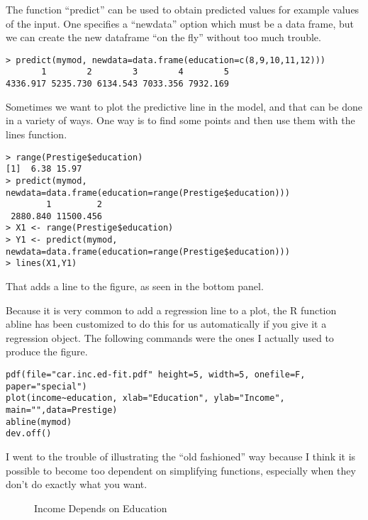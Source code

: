 The function ``predict'' can be used to obtain predicted values
for example values of the input. One specifies a ``newdata'' option
which must be a data frame, but we can create the new dataframe ``on
the fly'' without too much trouble. 

\begin{lstlisting}
> predict(mymod, newdata=data.frame(education=c(8,9,10,11,12)))
       1        2        3        4        5 
4336.917 5235.730 6134.543 7033.356 7932.169 
\end{lstlisting}
Sometimes we want to plot the predictive line in the model, and that
can be done in a variety of ways. One way is to find some points and
then use them with the lines function.

\begin{lstlisting}
> range(Prestige$education)
[1]  6.38 15.97
> predict(mymod, newdata=data.frame(education=range(Prestige$education)))
        1         2 
 2880.840 11500.456 
> X1 <- range(Prestige$education)
> Y1 <- predict(mymod, newdata=data.frame(education=range(Prestige$education)))
> lines(X1,Y1)
\end{lstlisting}
That adds a line to the figure, as seen in the bottom panel.

Because it is very common to add a regression line to a plot, the
R function abline has been customized to do this for us automatically
if you give it a regression object. The following commands were the
ones I actually used to produce the figure. 

\begin{lstlisting}[breaklines=true]
pdf(file="car.inc.ed-fit.pdf" height=5, width=5, onefile=F, paper="special")
plot(income~education, xlab="Education", ylab="Income", main="",data=Prestige)
abline(mymod)
dev.off()
\end{lstlisting}
I went to the trouble of illustrating the ``old fashioned'' way
because I think it is possible to become too dependent on simplifying
functions, especially when they don't do exactly what you want.

\begin{figure}
\begin{centering}
\par\end{centering}
\begin{centering}
\par\end{centering}
\caption{Income Depends on Education\label{fig:Income-DependsonEduc}}
\end{figure}

